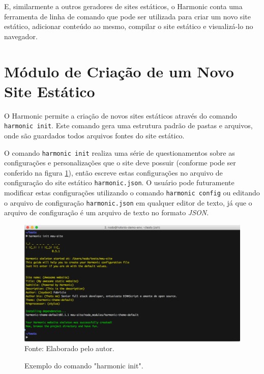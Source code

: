 \documentclass[ppginf, pep]{esinucpel}
\newcommand{\code}[1]{\texttt{#1}}
\begin{document}
E, similarmente a outros geradores de sites estáticos, o Harmonic conta uma ferramenta de linha de comando que pode ser utilizada para criar um novo site estático, adicionar conteúdo ao mesmo, compilar o site estático e visualizá-lo no navegador.

\section{Módulo de Criação de um Novo Site Estático}

O Harmonic permite a criação de novos sites estáticos através do comando \code{harmonic init}. Este comando gera uma estrutura padrão de pastas e arquivos, onde são guardados todos arquivos fontes do site estático. %

O comando \code{harmonic init} realiza uma série de questionamentos sobre as configurações e personalizações que o site deve possuir (conforme pode ser conferido na figura \ref{fig:harmonic_init}), então escreve estas configurações no arquivo de configuração do site estático \code{harmonic.json}. O usuário pode futuramente modificar estas configurações utilizando o comando \code{harmonic config} ou editando o arquivo de configuração \code{harmonic.json} em qualquer editor de texto, já que o arquivo de configuração é um arquivo de texto no formato \emph{JSON}.

\begin{figure}[H]
    \centering
    \caption{Exemplo do comando "harmonic init".}
    \vspace{5pt}
    \includegraphics[width=\textwidth]{harmonic_init}
    \\Fonte: Elaborado pelo autor.
    \label{fig:harmonic_init}
\end{figure}

\end{document}
